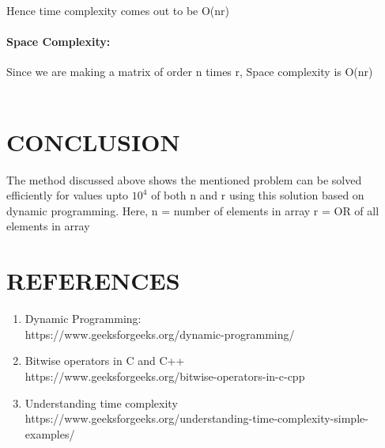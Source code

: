 \documentclass[10pt]{article}
\begin{document}
\begin{multicols*}{2}
Hence time complexity comes out to be O(nr)
\\

\paragraph{Space Complexity:} Since we are making a matrix of order n times r,
Space complexity is O(nr)
\\\\

\section*{CONCLUSION}

The method discussed above shows the mentioned problem can be solved efficiently for values upto \(10^4\)  of both  n and r using this solution based on dynamic programming.
Here,   n = number of elements in array
r = OR of all elements in array 



\section*{REFERENCES}

\begin{enumerate}
\item Dynamic Programming:\\
https://www.geeksforgeeks.org/dynamic-programming/
\item Bitwise operators in C and C++\\
https://www.geeksforgeeks.org/bitwise-operators-in-c-cpp
\item Understanding time complexity\\
https://www.geeksforgeeks.org/understanding-time-complexity-simple-examples/
\end{enumerate}


\end{multicols*}
\end{document}
